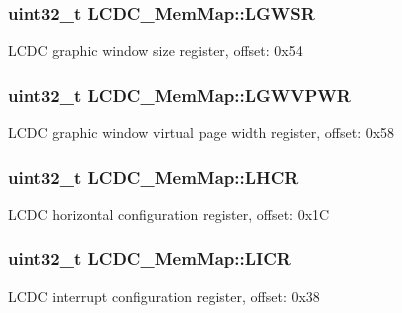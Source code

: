 \subsubsection[{L\+G\+W\+S\+R}]{\setlength{\rightskip}{0pt plus 5cm}uint32\+\_\+t L\+C\+D\+C\+\_\+\+Mem\+Map\+::\+L\+G\+W\+S\+R}\label{struct_l_c_d_c___mem_map_a3866d5fe438c9aeca7f50a30148aaee9}
L\+C\+D\+C graphic window size register, offset\+: 0x54 \hypertarget{struct_l_c_d_c___mem_map_a111052a9f42adf314c795dd509c8b740}{}
\subsubsection[{L\+G\+W\+V\+P\+W\+R}]{\setlength{\rightskip}{0pt plus 5cm}uint32\+\_\+t L\+C\+D\+C\+\_\+\+Mem\+Map\+::\+L\+G\+W\+V\+P\+W\+R}\label{struct_l_c_d_c___mem_map_a111052a9f42adf314c795dd509c8b740}
L\+C\+D\+C graphic window virtual page width register, offset\+: 0x58 \hypertarget{struct_l_c_d_c___mem_map_a7fbf22cdf2affd3ab924be930a2e2ef6}{}
\subsubsection[{L\+H\+C\+R}]{\setlength{\rightskip}{0pt plus 5cm}uint32\+\_\+t L\+C\+D\+C\+\_\+\+Mem\+Map\+::\+L\+H\+C\+R}\label{struct_l_c_d_c___mem_map_a7fbf22cdf2affd3ab924be930a2e2ef6}
L\+C\+D\+C horizontal configuration register, offset\+: 0x1\+C \hypertarget{struct_l_c_d_c___mem_map_a8ea08c18d8bfde4540eaf4e11039837e}{}
\subsubsection[{L\+I\+C\+R}]{\setlength{\rightskip}{0pt plus 5cm}uint32\+\_\+t L\+C\+D\+C\+\_\+\+Mem\+Map\+::\+L\+I\+C\+R}\label{struct_l_c_d_c___mem_map_a8ea08c18d8bfde4540eaf4e11039837e}
L\+C\+D\+C interrupt configuration register, offset\+: 0x38 \hypertarget{struct_l_c_d_c___mem_map_a602f30df3465d79b420243aaf1d51030}{}
